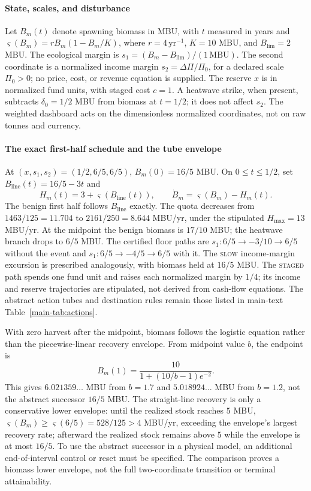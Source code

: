 \documentclass[preprint,11pt,authoryear]{elsarticle}
\theoremstyle{remark}
\newcommand{\act}[1]{\textsc{#1}}
\begin{document}
\paragraph{State, scales, and disturbance} Let $B_m(t)$ denote spawning biomass in MBU, with $t$ measured in years and $\varsigma(B_m)=rB_m(1-B_m/K)$, where $r=4\,\mathrm{yr}^{-1}$, $K=10$ MBU, and $B_{\mathrm{lim}}=2$ MBU. The ecological margin is $s_1=(B_m-B_{\mathrm{lim}})/(1\,\mathrm{MBU})$. The second coordinate is a normalized income margin $s_2=\Delta\Pi/\Pi_0$, for a declared scale $\Pi_0>0$; no price, cost, or revenue equation is supplied. The reserve $x$ is in normalized fund units, with staged cost $c=1$. A heatwave strike, when present, subtracts $\delta_0=1/2$ MBU from biomass at $t=1/2$; it does not affect $s_2$. The weighted dashboard acts on the dimensionless normalized coordinates, not on raw tonnes and currency.

\paragraph{The exact first-half schedule and the tube envelope} At $(x,s_1,s_2)=(1/2,6/5,6/5)$, $B_m(0)=16/5$ MBU. On $0\le t\le1/2$, set $B_{\mathrm{line}}(t)=16/5-3t$ and
\[
H_m(t)=3+\varsigma(B_{\mathrm{line}}(t)),\qquad \dot B_m=\varsigma(B_m)-H_m(t).
\]
The benign first half follows $B_{\mathrm{line}}$ exactly. The quota decreases from $1463/125=11.704$ to $2161/250=8.644$ MBU/yr, under the stipulated $H_{\max}=13$ MBU/yr. At the midpoint the benign biomass is $17/10$ MBU; the heatwave branch drops to $6/5$ MBU. The certified floor paths are $s_1:6/5\to-3/10\to6/5$ without the event and $s_1:6/5\to-4/5\to6/5$ with it. The \act{slow} income-margin excursion is prescribed analogously, with biomass held at $16/5$ MBU. The \act{staged} path spends one fund unit and raises each normalized margin by $1/4$; its income and reserve trajectories are stipulated, not derived from cash-flow equations. The abstract action tubes and destination rules remain those listed in main-text Table~\ref{main-tab:actions}.

With zero harvest after the midpoint, biomass follows the logistic equation rather than the piecewise-linear recovery envelope. From midpoint value $b$, the endpoint is
\[
B_m(1)=\frac{10}{1+(10/b-1)e^{-2}}.
\]
This gives $6.021359\ldots$ MBU from $b=1.7$ and $5.018924\ldots$ MBU from $b=1.2$, not the abstract successor $16/5$ MBU. The straight-line recovery is only a conservative lower envelope: until the realized stock reaches $5$ MBU, $\varsigma(B_m)\ge\varsigma(6/5)=528/125>4$ MBU/yr, exceeding the envelope's largest recovery rate; afterward the realized stock remains above $5$ while the envelope is at most $16/5$. To use the abstract successor in a physical model, an additional end-of-interval control or reset must be specified. The comparison proves a biomass lower envelope, not the full two-coordinate transition or terminal attainability.
\end{document}
